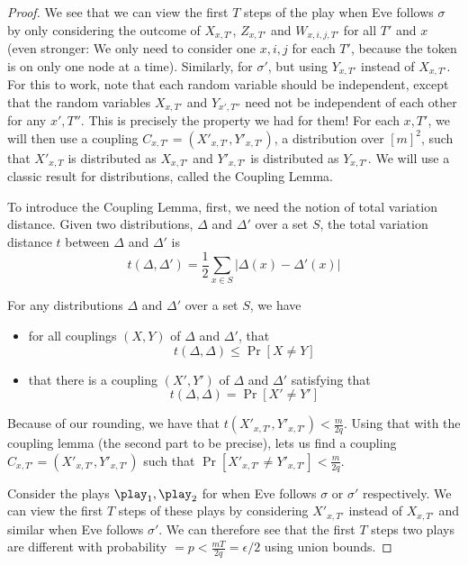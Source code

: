\begin{proof}
We see that we can view the first $T$ steps of the play when Eve follows $\sigma$ by only considering the outcome of $X_{x,T'}$, $Z_{x,T'}$ and $W_{x,i,j,T'}$ for all $T'$ and $x$ (even stronger: We only need to consider one $x,i,j$ for each $T'$, because the token is on only one node at a time). Similarly, for $\sigma'$, but using $Y_{x,T'}$ instead of $X_{x,T'}$.
For this to work, note that each random variable should be independent, except that the random variables $X_{x,T'}$ and $Y_{x',T''}$ need not be independent of each other for any $x',T''$. This is precisely the property we had for them!
For each $x,T'$,  we will then use a coupling $C_{x,T'}=(X'_{x,T'},Y'_{x,T'})$, a distribution over $[m]^2$, such that $X'_{x,T}$ is distributed as $X_{x,T'}$ and $Y'_{x,T'}$ is distributed as $Y_{x,T'}$. We will use a classic result for distributions, called the Coupling Lemma.

To introduce the Coupling Lemma, first, we need the notion of total variation distance. Given two distributions, $\Delta$ and $\Delta'$ over a set $S$, the total variation distance $t$ between $\Delta$ and $\Delta'$ is \[
t(\Delta,\Delta')=\frac{1}{2}\sum_{x\in S} |\Delta(x)-\Delta'(x)|
\] 

\begin{lemma}
For any distributions $\Delta$ and $\Delta'$ over a set $S$, we have 
\begin{itemize}
\item for all couplings $(X,Y)$ of $\Delta$ and $\Delta'$, that \[
t(\Delta,\Delta)\leq \Pr[X\neq Y]
\]
\item that there is a coupling $(X',Y')$ of $\Delta$ and $\Delta'$ satisfying that \[
t(\Delta,\Delta)= \Pr[X'\neq Y']
\]
\end{itemize}
\end{lemma}

Because of our rounding, we have that $t(X'_{x,T'},Y'_{x,T'})<\frac{m}{2q}$. 
Using that with the coupling lemma (the second part to be precise), lets us find a coupling $C_{x,T'}=(X'_{x,T'},Y'_{x,T'})$ 
such that $\Pr[X'_{x,T'}\neq Y'_{x,T'}]<\frac{m}{2q}$.

Consider the plays $\play_1,\play_2$ for when Eve follows $\sigma$ or $\sigma'$ respectively.
We can view the first $T$ steps of these plays by considering $X'_{x,T'}$ instead of $X_{x,T'}$ and similar when Eve follows $\sigma'$.
We can therefore see that the first $T$ steps two plays are different with probability 
$=p<\frac{mT}{2q}=\epsilon/2$
 using union bounds. 
 


\end{proof}
